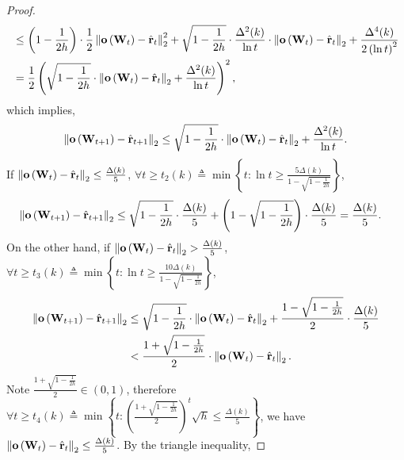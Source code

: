\begin{proof}
\begin{equation*}
\begin{split}
	&\le \left( 1 - \frac{1}{2 h} \right) \cdot \frac{1}{2} \left\| {\mathbf{o}}\left( {\mathbf{W}}_t \right) - \hat{{\mathbf{r}}}_t\right\|_2^2 + \sqrt{1 - \frac{1}{2 h} } \cdot \frac{\Delta^2(k)}{\ln{t}} \cdot \left\| {\mathbf{o}}\left( {\mathbf{W}}_t \right) - \hat{{\mathbf{r}}}_t\right\|_2 + \frac{\Delta^4(k)}{2 \left( \ln{t} \right)^2 } \\
	&= \frac{1}{2} \left( \sqrt{1 - \frac{1}{2 h} } \cdot \left\| {\mathbf{o}}\left( {\mathbf{W}}_t \right) - \hat{{\mathbf{r}}}_t\right\|_2 + \frac{\Delta^2(k)}{\ln{t}} \right)^2,
	\end{split}
	\end{equation*}
	which implies,
	\begin{equation*}
	    \left\| {\mathbf{o}}\left( {\mathbf{W}}_{t+1} \right) - \hat{{\mathbf{r}}}_{t+1}\right\|_2 \le \sqrt{1 - \frac{1}{2 h} } \cdot \left\| {\mathbf{o}}\left( {\mathbf{W}}_t \right) - \hat{{\mathbf{r}}}_t\right\|_2 + \frac{\Delta^2(k)}{\ln{t}}.
	\end{equation*}
	If $\left\| {\mathbf{o}}\left( {\mathbf{W}}_t \right) - \hat{{\mathbf{r}}}_t\right\|_2 \le \frac{\Delta(k)}{5}$, $\forall t \ge t_2(k) \triangleq \min\left\{ t: \ln{t} \ge \frac{5 \Delta(k) }{1 - \sqrt{1 - \frac{1}{2 h}}} \right\}$,
	\begin{equation*}
	\begin{split}
	\left\| {\mathbf{o}}\left( {\mathbf{W}}_{t+1} \right) - \hat{{\mathbf{r}}}_{t+1}\right\|_2 &\le \sqrt{1 - \frac{1}{2 h}} \cdot \frac{\Delta(k)}{5} + \left(1 - \sqrt{1 - \frac{1}{2 h}}\right) \cdot \frac{\Delta(k)}{5} = \frac{\Delta(k)}{5}.
	\end{split}
	\end{equation*}
	On the other hand, if $\left\| {\mathbf{o}}\left( {\mathbf{W}}_t \right) - \hat{{\mathbf{r}}}_t\right\|_2 > \frac{\Delta(k)}{5}$, $\forall t \ge t_3(k) \triangleq \min\left\{ t: \ln{t} \ge \frac{10 \Delta(k)}{1 - \sqrt{1 - \frac{1}{2 h}}} \right\}$,
	\begin{equation*}
	\begin{split}
	\left\| {\mathbf{o}}\left( {\mathbf{W}}_{t+1} \right) - \hat{{\mathbf{r}}}_{t+1}\right\|_2 &\le \sqrt{1 - \frac{1}{2 h}} \cdot \left\| {\mathbf{o}}\left( {\mathbf{W}}_t \right) - \hat{{\mathbf{r}}}_t\right\|_2 + \frac{1 - \sqrt{1 - \frac{1}{2 h}}}{2} \cdot \frac{\Delta(k)}{5} \\
	&< \frac{1 + \sqrt{1 - \frac{1}{2 h}}}{2} \cdot \left\| {\mathbf{o}}\left( {\mathbf{W}}_t \right) - \hat{{\mathbf{r}}}_t\right\|_2.
	\end{split}
	\end{equation*}
	Note $\frac{1 + \sqrt{1 - \frac{1}{2 h}}}{2} \in \left(0, 1\right)$, therefore $\forall t \ge t_4(k) \triangleq \min{\left\{ t : \left( \frac{1 + \sqrt{1 - \frac{1}{2 h}}}{2} \right)^t \sqrt{h} \le \frac{\Delta(k)}{5}  \right\}}$, we have $\left\| {\mathbf{o}}\left( {\mathbf{W}}_t \right) - \hat{{\mathbf{r}}}_t\right\|_2 \le \frac{\Delta(k)}{5}$. By the triangle inequality,

\end{proof}
